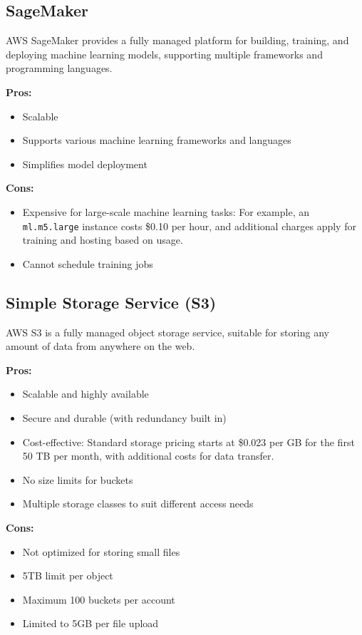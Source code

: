 \subsection*{SageMaker}
\label{aws:sage-maker}
AWS SageMaker provides a fully managed platform for building, training, and deploying machine learning models, supporting multiple frameworks and programming languages.

\textbf{Pros:}
\begin{itemize}
    \item Scalable
    \item Supports various machine learning frameworks and languages
    \item Simplifies model deployment
\end{itemize}

\textbf{Cons:}
\begin{itemize}
    \item Expensive for large-scale machine learning tasks: For example, an \texttt{ml.m5.large} instance costs \$0.10 per hour, and additional charges apply for training and hosting based on usage.
    \item Cannot schedule training jobs
\end{itemize}

\subsection*{Simple Storage Service (S3)}
\label{aws:s3}
AWS S3 is a fully managed object storage service, suitable for storing any amount of data from anywhere on the web.

\textbf{Pros:}
\begin{itemize}
    \item Scalable and highly available
    \item Secure and durable (with redundancy built in)
    \item Cost-effective: Standard storage pricing starts at \$0.023 per GB for the first 50 TB per month, with additional costs for data transfer.
    \item No size limits for buckets
    \item Multiple storage classes to suit different access needs
\end{itemize}

\textbf{Cons:}
\begin{itemize}
    \item Not optimized for storing small files
    \item 5TB limit per object
    \item Maximum 100 buckets per account
    \item Limited to 5GB per file upload
\end{itemize}


